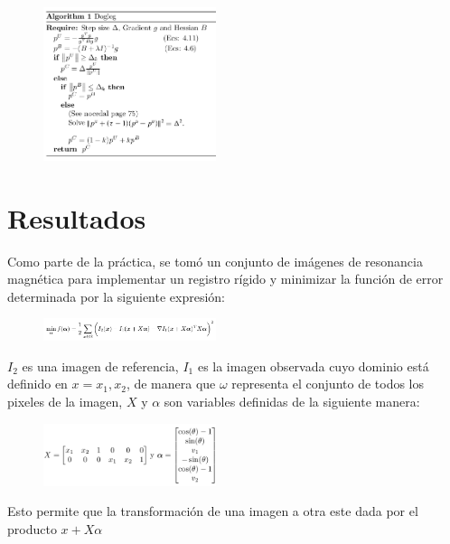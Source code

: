\documentclass[10pt,journal,compsoc]{styles/IEEEtran}
\begin{document}
 \begin{figure}[hbtp]
\centering
\includegraphics[width=0.45\textwidth]{dogleg.png}
\caption{}
\end{figure}
 
 
\section{Resultados}

Como parte de la pr\'actica, se tom\'o un conjunto de im\'agenes de resonancia magn\'etica para implementar un registro r\'igido y minimizar la funci\'on de error determinada por la siguiente expresi\'on:\\

\begin{figure}[hbtp]
\centering
\includegraphics[width=0.45\textwidth]{error.png}
\caption*{}
\end{figure}

$I_2$ es una imagen de referencia, $I_1$ es la imagen observada cuyo dominio est\'a definido en $x={x_1,x_2}$, de manera que $\omega$ representa el conjunto de todos los pixeles de la imagen, $X$ y $\alpha$ son variables definidas de la siguiente manera:\\

\begin{figure}[hbtp]
\centering
\includegraphics[width=0.45\textwidth]{variable.png}
\caption*{}
\end{figure}

Esto permite que la transformaci\'on de una imagen a otra este dada por el producto $x+X\alpha$\\
\end{document}
